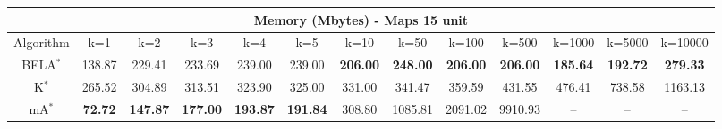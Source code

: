 \begin{tabular}{c|cccccccccccc}\toprule
\multicolumn{13}{c}{Memory (Mbytes) - Maps 15 unit}\\ \midrule
Algorithm & k=1 & k=2 & k=3 & k=4 & k=5 & k=10 & k=50 & k=100 & k=500 & k=1000 & k=5000 & k=10000 \\ \midrule
BELA$^*$ & 138.87 & 229.41 & 233.69 & 239.00 & 239.00 & \textbf{206.00} & \textbf{248.00} & \textbf{206.00} & \textbf{206.00} & \textbf{185.64} & \textbf{192.72} & \textbf{279.33} \\
K$^*$ & 265.52 & 304.89 & 313.51 & 323.90 & 325.00 & 331.00 & 341.47 & 359.59 & 431.55 & 476.41 & 738.58 & 1163.13 \\
mA$^*$ & \textbf{72.72} & \textbf{147.87} & \textbf{177.00} & \textbf{193.87} & \textbf{191.84} & 308.80 & 1085.81 & 2091.02 & 9910.93 & -- & -- & -- \\ \bottomrule 
\end{tabular}
